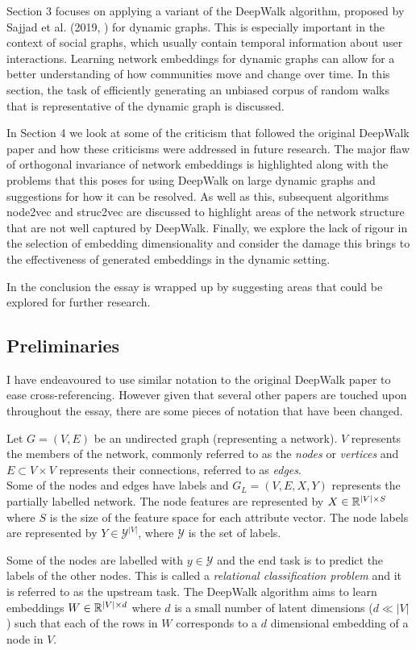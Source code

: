 \documentclass[a4paper]{article}
\begin{document}
Section 3 focuses on applying a variant of the DeepWalk algorithm, proposed
by Sajjad et al. (2019, \cite{sajjad2019}) for dynamic graphs. This is especially
important in the context of social graphs, which usually contain temporal information
about user interactions. Learning network embeddings for dynamic graphs can allow for a better understanding of how
communities move and change over time. In this section, the task of efficiently generating an unbiased corpus of random walks that is representative of
the dynamic graph is discussed.

In Section 4 we look at some of the criticism that followed the original DeepWalk paper and how these criticisms
were addressed in future research. The major flaw of orthogonal invariance of network embeddings is highlighted along with the problems that this poses for using DeepWalk on large dynamic graphs and suggestions for how it can be resolved.
As well as this, subsequent algorithms node2vec and struc2vec are discussed to highlight areas of the network structure that are not well captured by DeepWalk. Finally, we explore the lack of rigour in the selection of embedding dimensionality and consider the damage this brings to the effectiveness of generated embeddings in the dynamic setting.

In the conclusion the essay is wrapped up by suggesting areas that could be explored for further research.

\subsection{Preliminaries}
I have endeavoured to use similar notation to the original DeepWalk paper to ease
cross-referencing. However given that several other papers are touched upon
throughout the essay, there are some pieces of notation that have been changed.

\begin{definition}
  Let $G = (V, E)$ be an undirected graph (representing a network). $V$ represents the
  members of the network, commonly referred to as the \textit{nodes} or \textit{vertices} and $E \subset V
  \times V$ represents their connections, referred to as
  \textit{edges}.\\
  Some of the nodes and edges have labels and $G_L = (V, E, X, Y)$ represents the
  partially labelled network. The node features are represented by $X \in \R^{|V| \times S}$ where $S$ is the size of
  the feature space for each attribute vector. The node labels are represented by $Y \in \mathcal{Y}^{|V|}$, where $\mathcal{Y}$ is the set of labels.
\end{definition}
Some of the nodes are labelled with $y \in \mathcal{Y}$ and the end task is to
predict the labels of the other nodes. This is called a \textit{relational
  classification problem} and it is referred to as the upstream task. The DeepWalk algorithm aims to learn embeddings $W \in \R^{|V| \times d}$ where $d$ is a small number
of latent dimensions ($d \ll |V|$) such that each of the rows in $W$
corresponds to a $d$ dimensional embedding of a node in $V$.
\end{document}
